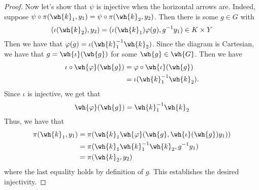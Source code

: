 \documentclass[12nt]{article}
\theoremstyle{plain}
\newtheorem{theorem}{Theorem}
\begin{document}
\begin{proof}
Now let's show that $\psi$ is injective when the horizontal arrows are. Indeed, suppose $\psi \circ \pi(\wh{k}_1, y_1) = \psi \circ \pi(\wh{k}_2, y_2)$. Then there is some $g \in G$ with 
\[
	(\iota(\wh{k}_2), y_2) = (\iota(\wh{k}_1 )\varphi(g), g^{-1}y_1) \in K \times Y
\]
Then we have that $\varphi(g) = \iota(\wh{k}_1^{-1}\wh{k}_2)$. Since the diagram is Cartesian, we have that $g = \wh{\iota}(\wh{g})$ for some $\wh{g} \in \wh{G}$. Then we have
\begin{align*}
	\iota \circ \wh{\varphi}(\wh{g}) &= \varphi \circ \wh{\iota}(\wh{g}) \\
	&= \iota(\wh{k}_1^{-1} \wh{k}_2).
\end{align*}
Since $\iota$ is injective, we get that 
\[
	\wh{\varphi}(\wh{g}) = \wh{k}_1^{-1} \wh{k}_2
\]
Thus, we have that 
\begin{align*}
	\pi(\wh{k}_1, y_1) &= \pi(\wh{k}_1 \wh{\varphi}(\wh{g}, \wh{\iota}(\wh{g})y_1)) \\
	&= \pi(\wh{k}_1\wh{k}_1^{-1} \wh{k}_2, g^{-1}y_1) \\
	&= \pi(\wh{k}_2, y_2)
\end{align*}
where the last equality holds by definition of $g$. This establishes the desired injectivity.
\end{proof}

\end{document}
